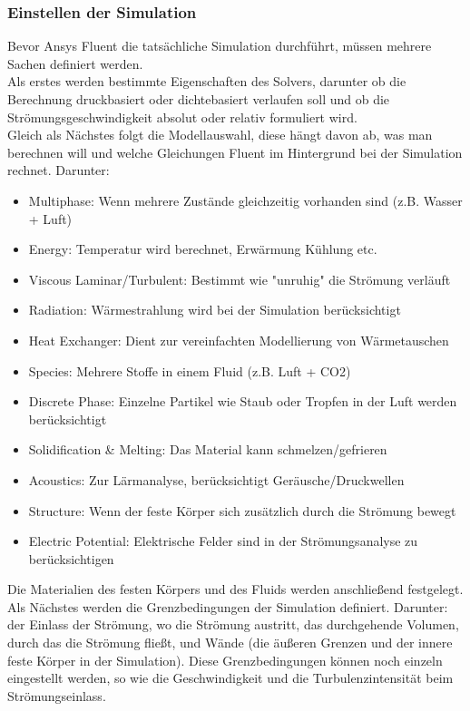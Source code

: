 \subsubsection*{Einstellen der Simulation}
\label{subsubsec:simulation_settings}
Bevor Ansys Fluent die tatsächliche Simulation durchführt, müssen mehrere Sachen definiert
werden. \\
Als erstes werden bestimmte Eigenschaften des Solvers, darunter ob die Berechnung druckbasiert oder dichtebasiert verlaufen soll und ob die Strömungsgeschwindigkeit absolut oder relativ formuliert wird. \\
Gleich als Nächstes folgt die Modellauswahl, diese hängt davon ab, was man berechnen will und welche Gleichungen Fluent im Hintergrund bei der Simulation rechnet. Darunter:
\begin{itemize}
    \item Multiphase: Wenn mehrere Zustände gleichzeitig vorhanden sind (z.B. Wasser + Luft)
    \item Energy: Temperatur wird berechnet, Erwärmung Kühlung etc.
    \item Viscous Laminar/Turbulent: Bestimmt wie "unruhig" die Strömung verläuft
    \item Radiation: Wärmestrahlung wird bei der Simulation berücksichtigt
    \item Heat Exchanger: Dient zur vereinfachten Modellierung von Wärmetauschen
    \item Species: Mehrere Stoffe in einem Fluid (z.B. Luft + CO2)
    \item Discrete Phase: Einzelne Partikel wie Staub oder Tropfen in der Luft werden berücksichtigt
    \item Solidification \& Melting: Das Material kann schmelzen/gefrieren
    \item Acoustics: Zur Lärmanalyse, berücksichtigt Geräusche/Druckwellen
    \item Structure: Wenn der feste Körper sich zusätzlich durch die Strömung bewegt
    \item Electric Potential: Elektrische Felder sind in der Strömungsanalyse zu berücksichtigen
\end{itemize}
\vspace{0.5cm}
Die Materialien des festen Körpers und des Fluids werden anschließend festgelegt. Als Nächstes werden die Grenzbedingungen der Simulation definiert. Darunter: der Einlass der Strömung, wo die Strömung austritt, das durchgehende Volumen, durch das die Strömung fließt, und Wände (die äußeren Grenzen und der innere feste Körper in der Simulation). Diese Grenzbedingungen können noch einzeln eingestellt werden, so wie die Geschwindigkeit und die Turbulenzintensität beim Strömungseinlass. \\

